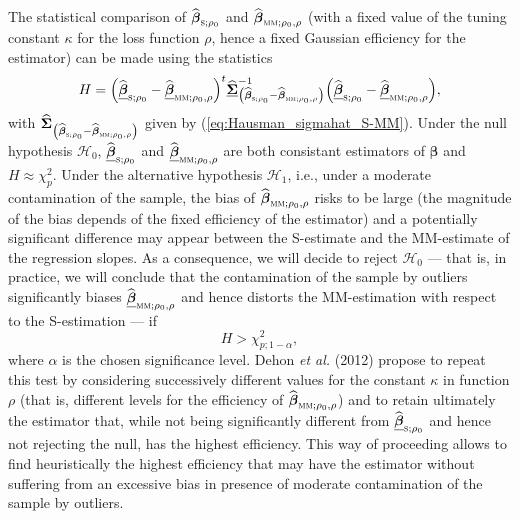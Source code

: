 The statistical comparison of $\sthat{\boldsymbol\beta}_{\stsc{S}%
;\rho_{0}}$ and $\sthat{\boldsymbol\beta}_{\stsc{MM};\rho_{0},\rho}$
(with a fixed value of the tuning constant $\kappa$ for the loss function
$\rho$, hence a fixed Gaussian efficiency for the  estimator) can be made
using the statistics
\begin{equation}
H=\left(  \sthat{\underline{\boldsymbol\beta}}_{\stsc{S};\rho_{0}%
}-\sthat{\underline{\boldsymbol\beta}}_{\stsc{MM};\rho_{0},\rho}\right)
^{t}\sthat{\underline{\boldsymbol{\Sigma}}}_{\left(  \widehat
{\boldsymbol\beta}_{\stsc{S};\rho_{0}}-\sthat{\boldsymbol\beta%
}_{\stsc{MM};\rho_{0},\rho}\right)  }^{-1}\left(  \sthat{\underline
{\boldsymbol\beta}}_{\stsc{S};\rho_{0}}-\sthat{\underline
{\boldsymbol\beta}}_{\stsc{MM};\rho_{0},\rho}\right)  ,
\label{Hausman_MMvsS}%
\end{equation}
with $\sthat{\boldsymbol{\Sigma}}_{\left(  \sthat{\boldsymbol\beta%
}_{\stsc{S};\rho_{0}}-\sthat{\boldsymbol\beta}_{\stsc{MM};\rho
_{0},\rho}\right)  }$ given by (\ref{eq:Hausman_sigmahat_S-MM}). Under the
null hypothesis $\mathcal{H}_{0}$, $\sthat{\underline{\boldsymbol\beta}%
}_{\stsc{S};\rho_{0}}$ and $\sthat{\underline{\boldsymbol\beta}%
}_{\stsc{MM};\rho_{0},\rho}$ are both consistant estimators of
\underline{$\boldsymbol\beta$} and $H\approx\chi_{p}^{2}$. Under the
alternative hypothesis $\mathcal{H}_{1}$, i.e., under a moderate contamination
of the sample, the bias of $\sthat{\boldsymbol\beta}_{\stsc{MM};\rho
_{0},\rho}$ risks to be large (the magnitude of the bias depends of the fixed
efficiency of the  estimator) and a potentially significant difference may
appear between the S-estimate and the MM-estimate of the regression slopes. As
a consequence, we will decide to reject $\mathcal{H}_{0}$ --- that is, in
practice, we will conclude that the contamination of the sample by outliers
significantly biases $\sthat{\underline{\boldsymbol\beta}}_{\stsc{MM}%
;\rho_{0},\rho}$ and hence distorts the MM-estimation with respect to the
S-estimation --- if
\[
H>\chi_{p;1-\alpha}^{2},
\]
where $\alpha$ is the chosen significance level. Dehon \textit{et al.} (2012)
propose to repeat this test by considering successively different values for
the constant $\kappa$ in function $\rho$ (that is, different levels for the
efficiency of $\sthat{\boldsymbol\beta}_{\stsc{MM};\rho_{0},\rho}$) and
to retain ultimately the  estimator that, while not being significantly
different from $\sthat{\underline{\boldsymbol\beta}}_{\stsc{S};\rho_{0}%
}$ and hence not rejecting the null, has the highest efficiency. This way of
proceeding allows to find heuristically the highest efficiency that may have
the  estimator without suffering from an excessive bias in presence of
moderate contamination of the sample by outliers.



